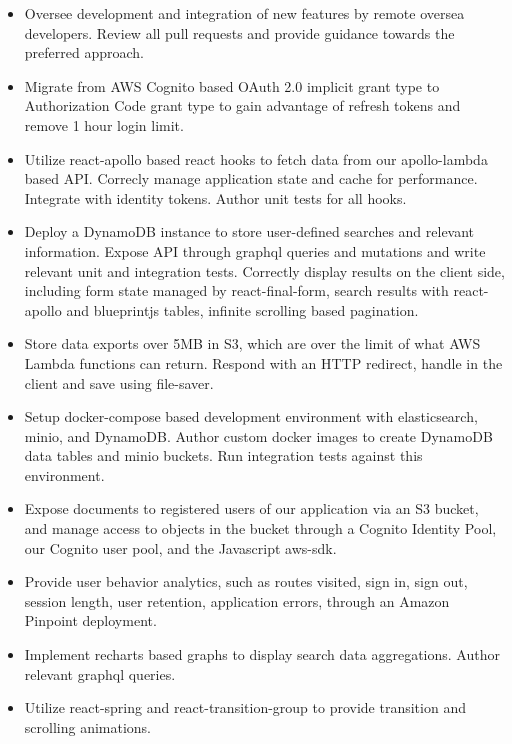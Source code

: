 \documentclass{res}
\begin{document}
\begin{resume}
\begin{position}
 \begin{itemize} \itemsep -2pt %
  \item Oversee development and integration of new features by remote oversea developers.
    Review all pull requests and provide guidance towards the preferred approach.
  \item Migrate from AWS Cognito based OAuth 2.0 implicit grant type to Authorization Code grant type
    to gain advantage of refresh tokens and remove 1 hour login limit.
  \item Utilize react-apollo based react hooks to fetch data from our apollo-lambda based API.
    Correcly manage application state and cache for performance. Integrate with identity tokens.
    Author unit tests for all hooks.
  \item Deploy a DynamoDB instance to store user-defined searches and relevant information.
    Expose API through graphql queries and mutations and write relevant unit and integration tests.
    Correctly display results on the client side, including form state managed by react-final-form,
    search results with react-apollo and blueprintjs tables, infinite scrolling based pagination.
  \item Store data exports over 5MB in S3, which are over the limit of what AWS Lambda
    functions can return. Respond with an HTTP redirect, handle in the client and save using file-saver.
  \item Setup docker-compose based development environment with elasticsearch, minio, and DynamoDB.
    Author custom docker images to create DynamoDB data tables and minio buckets. Run integration tests
    against this environment.
  \item Expose documents to registered users of our application via an S3 bucket, and manage access to objects
    in the bucket through a Cognito Identity Pool, our Cognito user pool, and the Javascript aws-sdk.
  \item Provide user behavior analytics, such as routes visited, sign in, sign out, session length, user retention,
    application errors, through an Amazon Pinpoint deployment.
  \item Implement recharts based graphs to display search data aggregations. Author relevant graphql queries.
  \item Utilize react-spring and react-transition-group to provide transition and scrolling animations.
 \end{itemize}
\end{position}


\end{resume}
\end{document}
